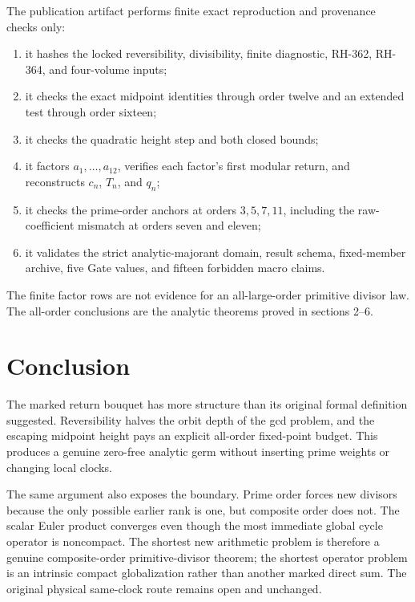 \documentclass[11pt]{article}
\numberwithin{equation}{section}
\theoremstyle{remark}
\begin{document}
The publication artifact performs finite exact reproduction and provenance
checks only:
\begin{enumerate}
\item it hashes the locked reversibility, divisibility, finite diagnostic,
RH-362, RH-364, and four-volume inputs;
\item it checks the exact midpoint identities through order twelve and an
extended test through order sixteen;
\item it checks the quadratic height step and both closed bounds;
\item it factors \(a_1,\ldots,a_{12}\), verifies each factor's first modular
return, and reconstructs \(c_n\), \(T_n\), and \(q_n\);
\item it checks the prime-order anchors at orders \(3,5,7,11\), including
the raw-coefficient mismatch at orders seven and eleven;
\item it validates the strict analytic-majorant domain, result schema,
fixed-member archive, five Gate values, and fifteen forbidden macro claims.
\end{enumerate}

The finite factor rows are not evidence for an all-large-order primitive
divisor law.  The all-order conclusions are the analytic theorems proved in
sections 2--6.

\section{Conclusion}

The marked return bouquet has more structure than its original formal
definition suggested.  Reversibility halves the orbit depth of the gcd
problem, and the escaping midpoint height pays an explicit all-order
fixed-point budget.  This produces a genuine zero-free analytic germ without
inserting prime weights or changing local clocks.

The same argument also exposes the boundary.  Prime order forces new
divisors because the only possible earlier rank is one, but composite order
does not.  The scalar Euler product converges even though the most immediate
global cycle operator is noncompact.  The shortest new arithmetic problem is
therefore a genuine composite-order primitive-divisor theorem; the shortest
operator problem is an intrinsic compact globalization rather than another
marked direct sum.  The original physical same-clock route remains open and
unchanged.



\end{document}
